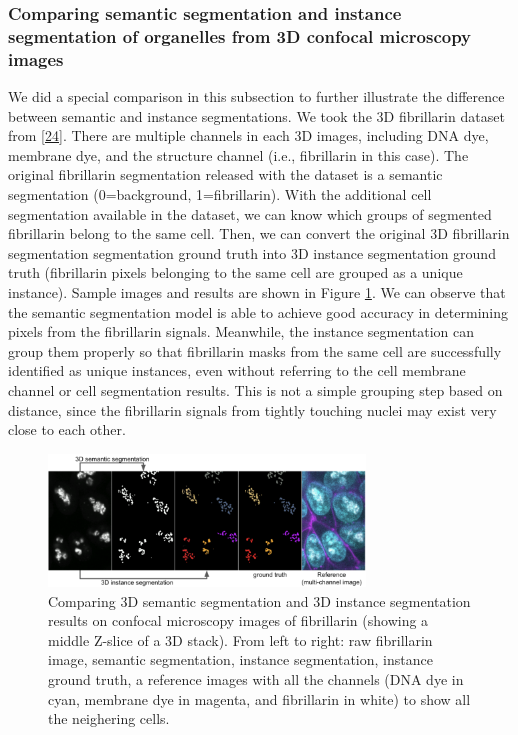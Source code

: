 \hypertarget{comparing-semantic-segmentation-and-instance-segmentation-of-organelles-from-3d-confocal-microscopy-images}{%
\subsubsection{Comparing semantic segmentation and instance segmentation of organelles from 3D confocal microscopy images}\label{comparing-semantic-segmentation-and-instance-segmentation-of-organelles-from-3d-confocal-microscopy-images}}

We did a special comparison in this subsection to further illustrate the difference between semantic and instance segmentations. We took the 3D fibrillarin dataset from {[}\protect\hyperlink{ref-5sGcmDuy}{24}{]}. There are multiple channels in each 3D images, including DNA dye, membrane dye, and the structure channel (i.e., fibrillarin in this case). The original fibrillarin segmentation released with the dataset is a semantic segmentation (0=background, 1=fibrillarin). With the additional cell segmentation available in the dataset, we can know which groups of segmented fibrillarin belong to the same cell. Then, we can convert the original 3D fibrillarin segmentation segmentation ground truth into 3D instance segmentation ground truth (fibrillarin pixels belonging to the same cell are grouped as a unique instance). Sample images and results are shown in Figure \ref{fig:3dseg}. We can observe that the semantic segmentation model is able to achieve good accuracy in determining pixels from the fibrillarin signals. Meanwhile, the instance segmentation can group them properly so that fibrillarin masks from the same cell are successfully identified as unique instances, even without referring to the cell membrane channel or cell segmentation results. This is not a simple grouping step based on distance, since the fibrillarin signals from tightly touching nuclei may exist very close to each other.

\begin{figure}
\hypertarget{fig:3dseg}{%
\centering
\includegraphics[width=0.75\textwidth,height=\textheight]{images/semantic_seg3d.png}
\caption{Comparing 3D semantic segmentation and 3D instance segmentation results on confocal microscopy images of fibrillarin (showing a middle Z-slice of a 3D stack). From left to right: raw fibrillarin image, semantic segmentation, instance segmentation, instance ground truth, a reference images with all the channels (DNA dye in cyan, membrane dye in magenta, and fibrillarin in white) to show all the neighering cells.}\label{fig:3dseg}
}
\end{figure}

